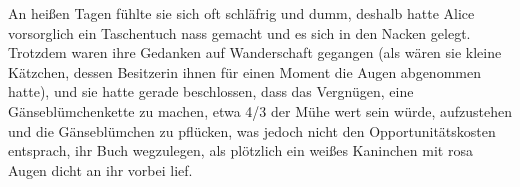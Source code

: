 {%
An heißen Tagen fühlte sie sich oft schläfrig und dumm, deshalb hatte Alice vorsorglich ein Taschentuch nass gemacht und es sich in den Nacken gelegt. Trotzdem waren ihre Gedanken auf Wanderschaft gegangen (als wären sie kleine Kätzchen, dessen Besitzerin ihnen für einen Moment die Augen abgenommen hatte), und sie hatte gerade beschlossen, dass das Vergnügen, eine Gänseblümchenkette zu machen, etwa 4/3 der Mühe wert sein würde, aufzustehen und die Gänseblümchen zu pflücken, was jedoch nicht den Opportunitätskosten entsprach, ihr Buch wegzulegen, als plötzlich ein weißes Kaninchen mit rosa Augen dicht an ihr vorbei lief.

}
